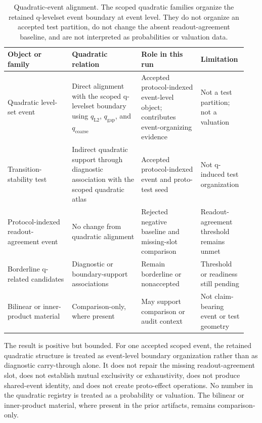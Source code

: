 \documentclass[11pt]{article}
\theoremstyle{definition}
\begin{document}
\begin{table}[t]
\centering
\small
\setlength{\tabcolsep}{4pt}
\begin{tabular}{p{0.26\linewidth}p{0.28\linewidth}p{0.24\linewidth}p{0.16\linewidth}}
\hline
\textbf{Object or family} & \textbf{Quadratic relation} & \textbf{Role in this run} & \textbf{Limitation} \\
\hline
Quadratic level-set event
&
Direct alignment with the scoped q-levelset boundary using $q_{\mathrm{L2}}$, $q_{\mathrm{gap}}$, and $q_{\mathrm{coarse}}$
&
Accepted protocol-indexed event-level object; contributes event-organizing evidence
&
Not a test partition; not a valuation
\\[0.4em]
Transition-stability test
&
Indirect quadratic support through diagnostic association with the scoped quadratic atlas
&
Accepted protocol-indexed event and proto-test seed
&
Not q-induced test organization
\\[0.4em]
Protocol-indexed readout-agreement event
&
No change from quadratic alignment
&
Rejected negative baseline and missing-slot comparison
&
Readout-agreement threshold remains unmet
\\[0.4em]
Borderline q-related candidates
&
Diagnostic or boundary-support associations
&
Remain borderline or nonaccepted
&
Threshold or readiness still pending
\\[0.4em]
Bilinear or inner-product material
&
Comparison-only, where present
&
May support comparison or audit context
&
Not claim-bearing event or test geometry
\\
\hline
\end{tabular}
\caption{Quadratic-event alignment. The scoped quadratic families organize the retained q-levelset event boundary at event level. They do not organize an accepted test partition, do not change the absent readout-agreement baseline, and are not interpreted as probabilities or valuation data.}
\label{tab:quadratic-alignment}
\end{table}

The result is positive but bounded. For one accepted scoped event, the retained quadratic structure is treated as event-level boundary organization rather than as diagnostic carry-through alone. It does not repair the missing readout-agreement slot, does not establish mutual exclusivity or exhaustivity, does not produce shared-event identity, and does not create proto-effect operations. No number in the quadratic registry is treated as a probability or valuation. The bilinear or inner-product material, where present in the prior artifacts, remains comparison-only.
\end{document}
